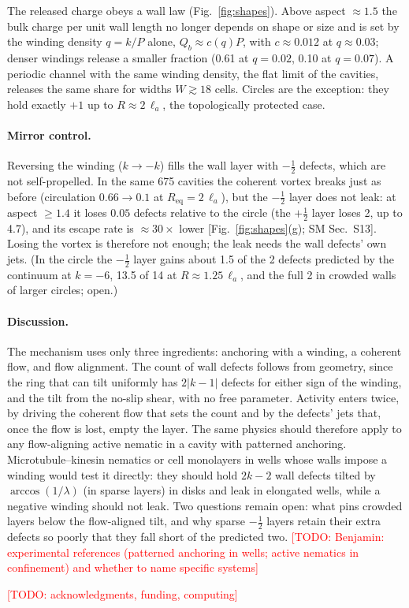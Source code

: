\documentclass[aps,prl,twocolumn,superscriptaddress,amsmath,amssymb,reprint]{revtex4-2}
\newcommand{\half}{\tfrac12}
\newcommand{\la}{\ell_a}
\newcommand{\todo}[1]{\textcolor{red}{[TODO: #1]}}
\begin{document}
The released charge obeys a wall law (Fig.~\ref{fig:shapes}). Above aspect $\approx1.5$ the bulk charge per unit wall length no longer depends on shape or size
and is set by the winding density $q=k/P$ alone, $Q_b\approx c(q)P$, with $c\approx0.012$ at $q\approx0.03$; denser windings release a smaller fraction
(0.61 at $q=0.02$, 0.10 at $q=0.07$). A periodic channel with the same winding density, the flat limit of the cavities, releases the same share for widths $W\gtrsim18$ cells. Circles are the
exception: they hold exactly $+1$ up to $R\approx2\,\la$, the topologically protected case.

\paragraph*{Mirror control.} Reversing the winding ($k\to-k$) fills the wall layer with $-\half$ defects, which are not self-propelled. In the same 675 cavities the
coherent vortex breaks just as before (circulation $0.66\to0.1$ at $R_\mathrm{eq}=2\,\la$), but the $-\half$ layer does not leak: at aspect $\geq1.4$ it loses
$0.05$ defects relative to the circle (the $+\half$ layer loses 2, up to 4.7), and its escape rate is $\approx30\times$ lower [Fig.~\ref{fig:shapes}(g); SM Sec.~S13].
Losing the vortex is therefore not enough; the leak needs the wall defects' own jets. (In the circle the $-\half$ layer gains about 1.5 of the 2 defects predicted
by the continuum at $k=-6$, 13.5 of 14 at $R\approx1.25\,\la$, and the full 2 in crowded walls of larger circles; open.)

\paragraph*{Discussion.} The mechanism uses only three ingredients: anchoring with a winding, a coherent flow, and flow alignment. The count of wall defects follows from
geometry, since the ring that can tilt uniformly has $2|k-1|$ defects for either sign of the winding, and the tilt from the no-slip shear, with no free parameter. Activity
enters twice, by driving the coherent flow that sets the count and by the defects' jets that, once the flow is lost, empty the layer. The same physics should therefore apply
to any flow-aligning active nematic in a cavity with patterned anchoring. Microtubule--kinesin nematics or cell monolayers in wells whose walls impose a winding would test it
directly: they should hold $2k-2$ wall defects tilted by $\arccos(1/\lambda)$ (in sparse layers) in disks and leak in elongated wells, while a negative winding should not leak. Two questions remain
open: what pins crowded layers below the flow-aligned tilt, and why sparse $-\half$ layers retain their extra defects so poorly that they fall short of the predicted two.
\todo{Benjamin: experimental references (patterned anchoring in wells; active nematics in confinement) and whether to name specific systems}

\begin{acknowledgments}
\todo{acknowledgments, funding, computing}
\end{acknowledgments}


\end{document}
